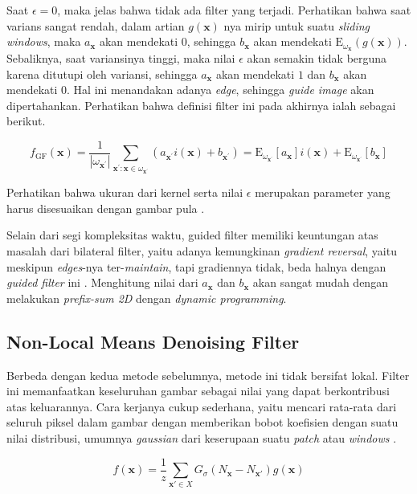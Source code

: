 \documentclass[11pt, a4paper, final]{report}
\begin{document}
Saat $\epsilon = 0$, maka jelas bahwa tidak ada filter yang terjadi. Perhatikan bahwa saat varians sangat rendah, dalam artian $g(\bm{x})$ nya mirip untuk suatu \textit{sliding windows}, maka $a_{\bm{x}}$ akan mendekati $0$, sehingga $b_{\bm{x}}$ akan mendekati $\mathrm{E}_{\omega_{\boldsymbol{x}}}(g(\bm{x}))$. Sebaliknya, saat variansinya tinggi, maka nilai $\epsilon$ akan semakin tidak berguna karena ditutupi oleh variansi, sehingga $a_{\bm{x}}$ akan mendekati $1$ dan $b_{\bm{x}}$ akan mendekati $0$. Hal ini menandakan adanya \textit{edge}, sehingga \textit{guide image} akan dipertahankan. Perhatikan bahwa definisi filter ini pada akhirnya ialah sebagai berikut.

$$
f_{\mathrm{GF}}(\boldsymbol{x})=\frac{1}{\left|\omega_{\boldsymbol{x}^{\prime}}\right|} \sum_{\boldsymbol{x}^{\prime}: \boldsymbol{x} \in \omega_{\boldsymbol{x}^{\prime}}}\left(a_{\boldsymbol{x}^{\prime}} i(\boldsymbol{x})+b_{\boldsymbol{x}^{\prime}}\right)=\mathrm{E}_{\omega_{\boldsymbol{x}^{\prime}}}\left[a_{\boldsymbol{x}}\right] i(\boldsymbol{x})+\mathrm{E}_{\omega_{\boldsymbol{x}^{\prime}}}\left[b_{\boldsymbol{x}}\right]
$$

Perhatikan bahwa ukuran dari kernel serta nilai $\epsilon$ merupakan parameter yang harus disesuaikan dengan gambar pula \cite{youtubeMaier}.

Selain dari segi kompleksitas waktu, guided filter memiliki keuntungan atas masalah dari bilateral filter, yaitu adanya kemungkinan \textit{gradient reversal}, yaitu meskipun \textit{edges}-nya ter-\textit{maintain}, tapi gradiennya tidak, beda halnya dengan \textit{guided filter} ini \cite{guidedFilter}. Menghitung nilai dari $a_{\bm{x}}$ dan $b_{\bm{x}}$ akan sangat mudah dengan melakukan \textit{prefix-sum 2D} dengan \textit{dynamic programming}. 

\subsection{Non-Local Means Denoising Filter}

Berbeda dengan kedua metode sebelumnya, metode ini tidak bersifat lokal. Filter ini memanfaatkan keseluruhan gambar sebagai nilai yang dapat berkontribusi atas keluarannya. Cara kerjanya cukup sederhana, yaitu mencari rata-rata dari seluruh piksel dalam gambar dengan memberikan bobot koefisien dengan suatu nilai distribusi, umumnya \textit{gaussian} dari keserupaan suatu \textit{patch} atau \textit{windows} \cite{buades2011non}.

$$
f(\bm{x}) = \frac{1}{z} \sum_{\bm{x}' \in X} G_\sigma (N_{\bm{x}} - N_{\bm{x}'}) g(\bm{x})
$$
\end{document}

